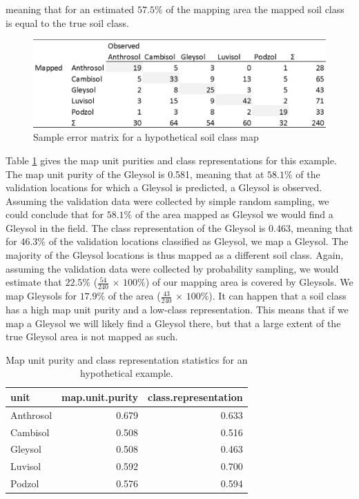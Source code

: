 \documentclass[10pt,b5paper,]{book}
\theoremstyle{definition}
\theoremstyle{definition}
\theoremstyle{definition}
\theoremstyle{remark}
\begin{document}
meaning that for an estimated \(57.5\%\) of the mapping area the mapped
soil class is equal to the true soil class.

\begin{figure}

{\centering \includegraphics[width=0.8\linewidth]{images/Validation_error_matrix2} 

}

\caption{Sample error matrix for a hypothetical soil class map}\label{fig:errormatrix2}
\end{figure}

Table \ref{tab:purity} gives the map unit purities and class
representations for this example. The map unit purity of the Gleysol is
0.581, meaning that at \(58.1\%\) of the validation locations for which
a Gleysol is predicted, a Gleysol is observed. Assuming the validation
data were collected by simple random sampling, we could conclude that
for \(58.1\%\) of the area mapped as Gleysol we would find a Gleysol in
the field. The class representation of the Gleysol is 0.463, meaning
that for \(46.3\%\) of the validation locations classified as Gleysol,
we map a Gleysol. The majority of the Gleysol locations is thus mapped
as a different soil class. Again, assuming the validation data were
collected by probability sampling, we would estimate that \(22.5\%\)
(\(\frac{54}{240}\) \(\times\) \(100\%\)) of our mapping area is covered
by Gleysols. We map Gleysols for \(17.9\%\) of the area
(\(\frac{43}{240}\) \(\times\) \(100\%\)). It can happen that a soil
class has a high map unit purity and a low-class representation. This
means that if we map a Gleysol we will likely find a Gleysol there, but
that a large extent of the true Gleysol area is not mapped as such.

\begin{table}

\caption{\label{tab:purity}Map unit purity and class representation statistics for an hypothetical example.}
\centering
\begin{tabular}[t]{lrr}
\toprule
unit & map.unit.purity & class.representation\\
\midrule
Anthrosol & 0.679 & 0.633\\
Cambisol & 0.508 & 0.516\\
Gleysol & 0.508 & 0.463\\
Luvisol & 0.592 & 0.700\\
Podzol & 0.576 & 0.594\\
\bottomrule
\end{tabular}
\end{table}
\end{document}
